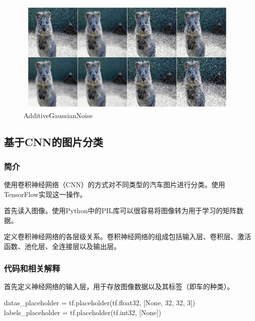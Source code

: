 \documentclass[12pt]{report}
\begin{document}
\begin{figure}[h]


 
  \includegraphics[width=.8\textwidth]{G.png} %
  \caption{AdditiveGaussianNoise} %
  \label{DirectedEdgeDetect} %
\end{figure}

\subsection{基于CNN的图片分类}
\subsubsection{简介}

使用卷积神经网络（CNN）的方式对不同类型的汽车图片进行分类。使用TensorFlow实现这一操作。

首先读入图像。使用Python中的PIL库可以很容易将图像转为用于学习的矩阵数据。

定义卷积神经网络的各层级关系。卷积神经网络的组成包括输入层、卷积层、激活函数、池化层、全连接层以及输出层。

\subsubsection{代码和相关解释}
首先定义神经网络的输入层，用于存放图像数据以及其标签（即车的种类）。
\begin{python}
datas_placeholder = tf.placeholder(tf.float32, [None, 32, 32, 3])
labels_placeholder = tf.placeholder(tf.int32, [None])
\end{python}
\end{document}
